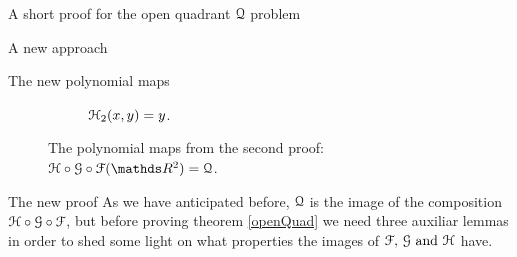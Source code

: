 \documentclass[11pt, a4paper, english, twoside, notitlepage, openright]{report}
\begin{document}
\begin{chapter}{A short proof for the open quadrant $\mathcal{Q}$ problem}
\begin{section}{A new approach}
\begin{subsection}{The new polynomial maps}
\begin{figure}
\begin{subfigure}{.49\linewidth}
\vspace{0.15cm}\caption{$\mathcal{H}_2(x, y) = y$.\label{fig:HH_2}}
\end{subfigure}
\vspace{0.7cm}\caption{The polynomial maps from the second proof: $\HH \circ \GG \circ \FF (\R ^2) = \Qu$.\label{fig:ch2Maps}}
\end{figure}
\end{subsection}
\end{section}

\begin{section}{The new proof}
As we have anticipated before, $\mathcal{Q}$ is the image of the composition $\mathcal{H} \circ \mathcal{G} \circ \mathcal{F}$, but before proving theorem \ref{openQuad} we need three auxiliar lemmas in order to shed some light on what properties the images of $\mathcal{F},\, \mathcal{G} \text { and }\mathcal{H}$ have.


\end{section}
\end{chapter}
\end{document}
